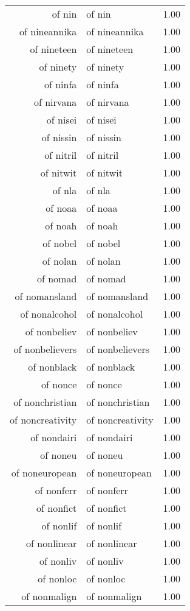 \begin{table}[ht]
\begin{tabular}{rlr}
  of nin & of nin & 1.00 \\ 
  of nineannika & of nineannika & 1.00 \\ 
  of nineteen & of nineteen & 1.00 \\ 
  of ninety & of ninety & 1.00 \\ 
  of ninfa & of ninfa & 1.00 \\ 
  of nirvana & of nirvana & 1.00 \\ 
  of nisei & of nisei & 1.00 \\ 
  of nissin & of nissin & 1.00 \\ 
  of nitril & of nitril & 1.00 \\ 
  of nitwit & of nitwit & 1.00 \\ 
  of nla & of nla & 1.00 \\ 
  of noaa & of noaa & 1.00 \\ 
  of noah & of noah & 1.00 \\ 
  of nobel & of nobel & 1.00 \\ 
  of nolan & of nolan & 1.00 \\ 
  of nomad & of nomad & 1.00 \\ 
  of nomansland & of nomansland & 1.00 \\ 
  of nonalcohol & of nonalcohol & 1.00 \\ 
  of nonbeliev & of nonbeliev & 1.00 \\ 
  of nonbelievers & of nonbelievers & 1.00 \\ 
  of nonblack & of nonblack & 1.00 \\ 
  of nonce & of nonce & 1.00 \\ 
  of nonchristian & of nonchristian & 1.00 \\ 
  of noncreativity & of noncreativity & 1.00 \\ 
  of nondairi & of nondairi & 1.00 \\ 
  of noneu & of noneu & 1.00 \\ 
  of noneuropean & of noneuropean & 1.00 \\ 
  of nonferr & of nonferr & 1.00 \\ 
  of nonfict & of nonfict & 1.00 \\ 
  of nonlif & of nonlif & 1.00 \\ 
  of nonlinear & of nonlinear & 1.00 \\ 
  of nonliv & of nonliv & 1.00 \\ 
  of nonloc & of nonloc & 1.00 \\ 
  of nonmalign & of nonmalign & 1.00 \\ 

\end{tabular}
\end{table}
